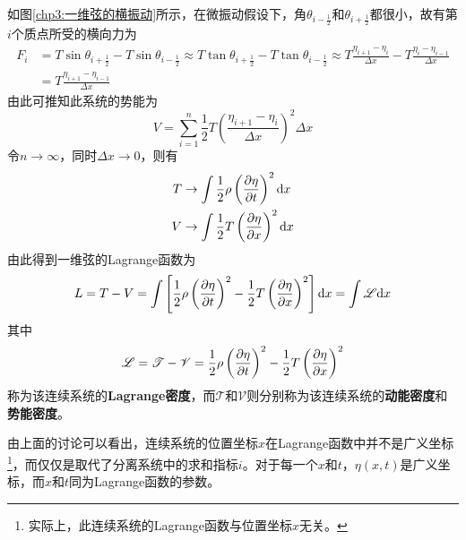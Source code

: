 如图\ref{chp3:一维弦的横振动}所示，在微振动假设下，角$\theta_{i-\frac12}$和$\theta_{i+\frac12}$都很小，故有第$i$个质点所受的横向力为
\begin{align}
	F_i & = T\sin \theta_{i+\frac12} - T\sin \theta_{i-\frac12} \approx T\tan \theta_{i+\frac12} - T\tan \theta_{i-\frac12} \approx T \frac{\eta_{i+1}-\eta_i}{\Delta x} - T \frac{\eta_i-\eta_{i-1}}{\Delta x} \nonumber \\
	& = T\frac{\eta_{i+1}-\eta_{i-1}}{\Delta x}
	\label{连续系统的Lagrange方程-2}
\end{align}
由此可推知此系统的势能为
\begin{equation}
	V = \sum_{i=1}^n \frac12 T\left(\frac{\eta_{i+1}-\eta_i}{\Delta x}\right)^2 \Delta x
	\label{连续系统的Lagrange方程-3}
\end{equation}
令$n \to \infty$，同时$\Delta x\to 0$，则有
\begin{align}
	T & \to \int \frac12 \rho \left(\frac{\partial \eta}{\partial t}\right)^2 \mathrm{d}x \label{连续系统的Lagrange方程-4} \\
	V & \to \int \frac12 T\left(\frac{\partial \eta}{\partial x}\right)^2 \mathrm{d}x \label{连续系统的Lagrange方程-5}
\end{align}
由此得到一维弦的Lagrange函数为
\begin{equation}
	L = T-V = \int \left[\frac12 \rho \left(\frac{\partial \eta}{\partial t}\right)^2 - \frac12 T\left(\frac{\partial \eta}{\partial x}\right)^2\right] \mathrm{d}x = \int \mathscr{L} \mathrm{d}x
	\label{连续系统的Lagrange方程-5}
\end{equation}
其中
\begin{equation}
	\mathscr{L} = \mathscr{T} - \mathscr{V} = \frac12 \rho \left(\frac{\partial \eta}{\partial t}\right)^2 - \frac12 T \left(\frac{\partial \eta}{\partial x}\right)^2 
	\label{连续系统的Lagrange方程-6}
\end{equation}
称为该连续系统的{\bf Lagrange密度}，而$\mathscr{T}$和$\mathscr{V}$则分别称为该连续系统的{\bf 动能密度}和{\bf 势能密度}。

由上面的讨论可以看出，连续系统的位置坐标$x$在Lagrange函数中并不是广义坐标\footnote{实际上，此连续系统的Lagrange函数与位置坐标$x$无关。}，而仅仅是取代了分离系统中的求和指标$i$。对于每一个$x$和$t$，$\eta(x,t)$是广义坐标，而$x$和$t$同为Lagrange函数的参数。

